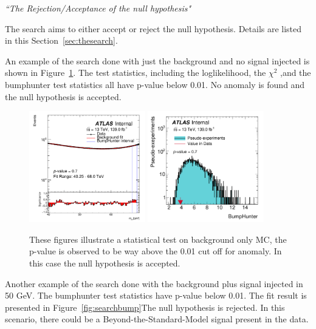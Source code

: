 \textit{``The Rejection/Acceptance of the null hypothesis"}

The search aims to either accept or reject the null hypothesis. Details are listed in this Section~\ref{sec:thesearch}.

An example of the search done with just the background and no signal injected is shown in Figure~\ref{fig:searchnull}. The test statistics, including 
the loglikelihood, the $\chi^{2}$ ,and the bumphunter test statistics all have p-value below 0.01. No anomaly is found and the null hypothesis is accepted.
    
\begin{figure}[!htb]
    \begin{center}
        \includegraphics[width=0.45\textwidth]{figures/chapter_dimuon/nominal_fixed}
        \includegraphics[width=0.45\textwidth]{figures/chapter_dimuon/bumpHunterStatPlot}
        \caption{
        These figures illustrate a statistical test on background only MC, the p-value is observed to be way above the 0.01 cut off for anomaly. In  this case the null hypothesis is accepted.
        }
    \label{fig:searchnull}
    \end{center}
\end{figure}
\FloatBarrier

Another example of the search done with the background plus signal injected in 50 GeV. The bumphunter test statistics have p-value below 0.01. The fit result is presented in Figure~\ref{fig:searchbump}The null hypothesis is rejected. In this scenario, there could be a Beyond-the-Standard-Model signal present in the data.

